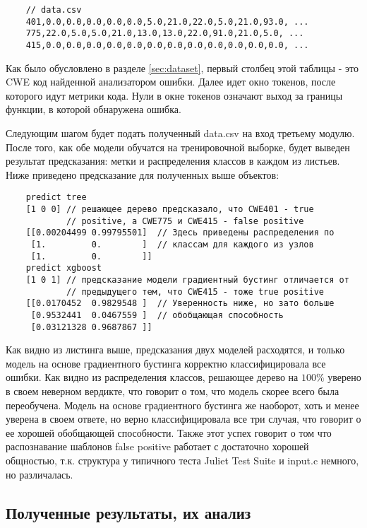 \begin{verbatim}
    // data.csv
    401,0.0,0.0,0.0,0.0,0.0,5.0,21.0,22.0,5.0,21.0,93.0, ...
    775,22.0,5.0,5.0,21.0,13.0,13.0,22.0,91.0,21.0,5.0, ... 
    415,0.0,0.0,0.0,0.0,0.0,0.0,0.0,0.0,0.0,0.0,0.0,0.0, ...
\end{verbatim}

Как было обусловлено в разделе \ref{sec:dataset}, первый столбец этой таблицы - это CWE код найденной анализатором ошибки. Далее идет окно токенов, после которого идут метрики кода. Нули в окне токенов означают выход за границы функции, в которой обнаружена ошибка.

Следующим шагом будет подать полученный data.csv на вход третьему модулю. После того, как обе модели обучатся на тренировочной выборке, будет выведен результат предсказания: метки и распределения классов в каждом из листьев. Ниже приведено предсказание для полученных выше объектов:

\begin{verbatim}
    predict tree
    [1 0 0] // решающее дерево предсказало, что CWE401 - true 
            // positive, а CWE775 и CWE415 - false positive 
    [[0.00204499 0.99795501]  // Здесь приведены распределения по
     [1.         0.        ]  // классам для каждого из узлов
     [1.         0.        ]]  
    predict xgboost
    [1 0 1] // предсказание модели градиентный бустинг отличается от
            // предыдущего тем, что CWE415 - тоже true positive
    [[0.0170452  0.9829548 ]  // Уверенность ниже, но зато больше 
     [0.9532441  0.0467559 ]  // обобщающая способность
     [0.03121328 0.9687867 ]]
\end{verbatim}

Как видно из листинга выше, предсказания двух моделей расходятся, и только модель на основе градиентного бустинга корректно классифицировала все ошибки. Как видно из распределения классов, решающее дерево на $100\%$ уверено в своем неверном вердикте, что говорит о том, что модель скорее всего была переобучена. Модель на основе градиентного бустинга же наоборот, хоть и менее уверена в своем ответе, но верно классифицировала все три случая, что говорит о ее хорошей обобщающей способности. Также этот успех говорит о том что распознавание шаблонов false positive работает с достаточно хорошей общностью, т.к. структура у типичного теста Juliet Test Suite и input.c немного, но различалась.

\subsection{Полученные результаты, их анализ}


